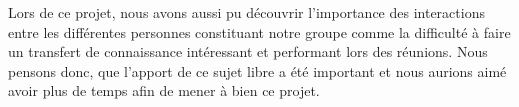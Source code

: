 \documentclass{report}
\begin{document}
Lors de ce projet, nous avons aussi pu découvrir l’importance des interactions entre les différentes personnes constituant notre groupe comme la difficulté à faire un transfert de connaissance intéressant et performant lors des réunions. Nous pensons donc, que l’apport de ce sujet libre a été important et nous aurions aimé avoir plus de temps afin de mener à bien ce projet.
\end{document}
